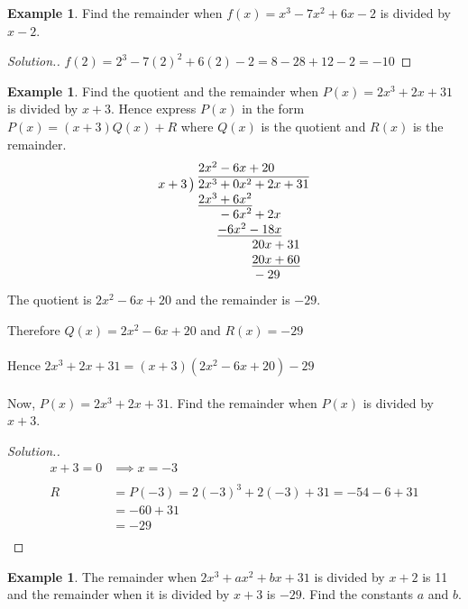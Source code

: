 \documentclass[11pt,a4paper]{article}
\theoremstyle{definition}
\newtheorem{example}[thm]{Example}
\newenvironment{solution}
  {\renewcommand{\qedsymbol}{}\begin{proof}[\textit{Solution}.]}
  {\end{proof}}
\begin{document}
\begin{example}

Find the remainder when $f(x)=x^3-7x^2+6x-2$ is divided by $x-2$.
\end{example}
\begin{solution}

$f(2)=2^3-7(2)^2+6(2)-2=8-28+12-2 =-10$
\end{solution}
\begin{example}

Find the quotient and the remainder when $P(x)=2x^3+2x+31$ is divided by $x+3$. Hence express $P(x)$ in the form $P(x)=(x+3)Q(x)+R$ where $Q(x)$ is the quotient and $R(x)$ is the remainder.
$$\begin{array}{r@{\;}l}
 & 2x^{2}-6x+20\\
x+3\,\big) & \overline{2x^{3}+0x^{2}+2x+31}\\
 & \underline{2x^{3}+6x^{2}}\phantom{{}+2x+31}\\
 & \phantom{2x^{3}}-6x^{2}+2x\phantom{{}+31}\\
 & \phantom{2x^{3}}\underline{-6x^{2}-18x}\phantom{{}+31}\\
 & \phantom{2x^{3}-6x^{2}}20x+31\\
 & \phantom{2x^{3}-6x^{2}}\underline{20x+60}\\
 & \phantom{2x^{3}-6x^{2}}-29
\end{array}$$
The quotient is $2x^{2}-6x+20$ and the remainder is $-29$.

Therefore $Q(x)=2x^2-6x+20$ and $R(x)=-29$\\\\
Hence $2x^3+2x+31=(x+3)(2x^2-6x+20)-29$\\\\


Now, $P(x)=2x^3+2x+31$. Find the remainder when $P(x)$ is divided by $x+3$.
\end{example}
\begin{solution}

\begin{align*}
x+3=0 & \implies x=-3\\\\
R & = P(-3) = 2(-3)^3+2(-3)+31=-54-6+31\\
  & = -60 + 31\\
  & = -29\\
\end{align*}
\end{solution}
\begin{example}

The remainder when $2x^3+ax^2+bx+31$ is divided by $x+2$ is 11 and the remainder when it is divided by $x+3$ is $-29$. Find the constants $a$ and $b$.
\end{example}
\end{document}
